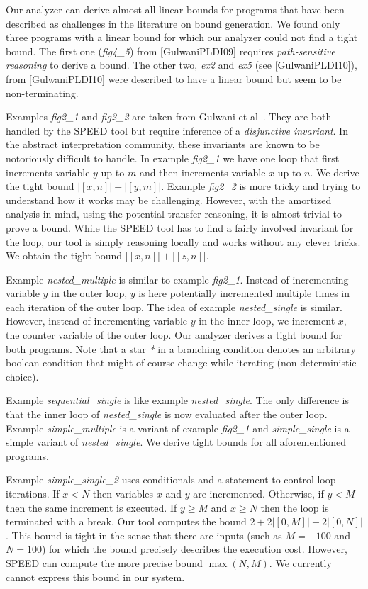 \documentclass[nocopyrightspace,preprint]{sigplanconf}
\begin{document}
Our analyzer can derive almost all linear bounds for programs that
have been described as challenges in the literature on bound
generation.  We found only three programs with a linear bound for
which our analyzer could not find a tight bound.  The first one
(\emph{fig4\_5}) from [GulwaniPLDI09] requires \emph{path-sensitive
  reasoning} to derive a bound.  The other two, \emph{ex2} and
\emph{ex5} (see [GulwaniPLDI10]), from [GulwaniPLDI10] were described
to have a linear bound but seem to be non-terminating.

Examples \emph{fig2\_1} and \emph{fig2\_2} are taken from Gulwani et
al~\cite{Gulwani-speed}.  They are both handled by the SPEED tool but
require inference of a \emph{disjunctive invariant}.  In the abstract
interpretation community, these invariants are known to be notoriously
difficult to handle.
%
In example \emph{fig2\_1} we have one loop that first increments
variable $y$ up to $m$ and then increments variable $x$ up to $n$.  We
derive the tight bound $|[x, n]| + |[y, m]|$.
%
Example \emph{fig2\_2} is more tricky and trying to understand how it
works may be challenging.  However, with the amortized analysis in
mind, using the potential transfer reasoning, it is almost trivial to
prove a bound.  While the SPEED tool has to find a fairly
involved invariant for the loop, our tool is simply reasoning locally
and works without any clever tricks. We obtain the tight bound $|[x,
n]| + |[z, n]|$.

Example \emph{nested\_multiple} is similar to example \emph{fig2\_1}.
Instead of incrementing variable $y$ in the outer loop, $y$ is here
potentially incremented multiple times in each iteration of the outer
loop.  The idea of example \emph{nested\_single} is similar.  However,
instead of incrementing variable $y$ in the inner loop, we increment
$x$, the counter variable of the outer loop. Our analyzer derives a
tight bound for both programs.  Note that a star \emph{*} in a
branching condition denotes an arbitrary boolean condition that might
of course change while iterating (non-deterministic choice).

Example \emph{sequential\_single} is like example
\emph{nested\_single}.  The only difference is that the inner loop of
\emph{nested\_single} is now evaluated after the outer loop.  Example
\emph{simple\_multiple} is a variant of example \emph{fig2\_1} and
\emph{simple\_single} is a simple variant of \emph{nested\_single}.
We derive tight bounds for all aforementioned programs.

Example \emph{simple\_single\_2} uses conditionals and a 
statement to control loop iterations.  If $x<N$ then variables $x$ and
$y$ are incremented.  Otherwise, if $y<M$ then the same increment is
executed.  If $y\geq M$ and $x\geq N$ then the loop is terminated with
a break.  Our tool computes the bound $2 + 2 |[0, M]| + 2 |[0, N]|$.
This bound is tight in the sense that there are inputs (such as $M =
-100$ and $N = 100$) for which the bound precisely describes the
execution cost.  However, SPEED can compute the more precise bound
$\max(N,M)$.  We currently cannot express this bound in our system.
\end{document}
